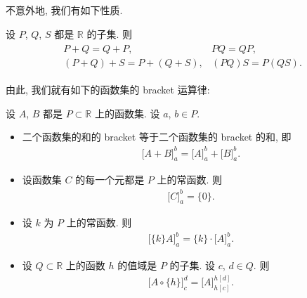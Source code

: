 不意外地, 我们有如下性质.

\begin{theorem}
    设 $P$, $Q$, $S$ 都是 $\mathbb{R}$ 的子集. 则
    \begin{align*}
        \begin{array}{ll}
            P + Q = Q + P,             & PQ = QP,       \\
            (P + Q) + S = P + (Q + S), & (PQ)S = P(QS).
        \end{array}
    \end{align*}
\end{theorem}


由此, 我们就有如下的函数集的 bracket 运算律:

\begin{theorem}
    设 $A$, $B$ 都是 $P \subset \mathbb{R}$ 上的函数集. 设 $a$, $b \in P$.
    \begin{itemize}
        \item 二个函数集的和的 bracket 等于二个函数集的 bracket 的和, 即
              \begin{align*}
                  \big[ A + B \big]_{a}^{b} = \big[ A \big]_{a}^{b} + \big[ B \big]_{a}^{b}.
              \end{align*}
        \item 设函数集 $C$ 的每一个元都是 $P$ 上的常函数. 则
              \begin{align*}
                  \big[ C \big]_{a}^{b} = \{ 0 \}.
              \end{align*}
        \item 设 $k$ 为 $P$ 上的常函数. 则
              \begin{align*}
                  \big[ \{ k \} A \big]_{a}^{b} = \{ k \} \cdot \big[ A \big]_{a}^{b}.
              \end{align*}
        \item 设 $Q \subset \mathbb{R}$ 上的函数 $h$ 的值域是 $P$ 的子集. 设 $c$, $d \in Q$. 则
              \begin{align*}
                  \big[ A \circ \{ h \} \big]_{c}^{d} = \big[ A \big]_{h[c]}^{h[d]}.
              \end{align*}
    \end{itemize}
\end{theorem}

